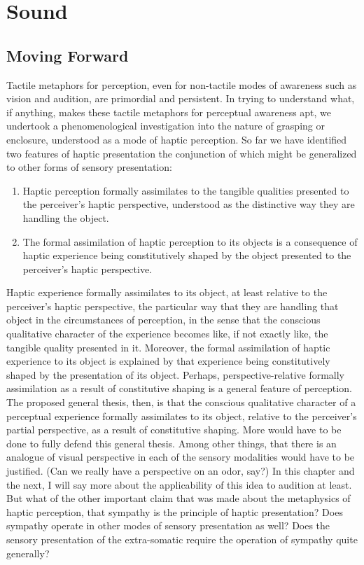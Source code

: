 \chapter{Sound} %
\label{cha:sound}

\section{Moving Forward} %
\label{sec:moving_forward}

Tactile metaphors for perception, even for non-tactile modes of awareness such as vision and audition, are primordial and persistent. In trying to understand what, if anything, makes these tactile metaphors for perceptual awareness apt, we undertook a phenomenological investigation into the nature of grasping or enclosure, understood as a mode of haptic perception. So far we have identified two features of haptic presentation the conjunction of which might be generalized to other forms of sensory presentation: 
\begin{enumerate}[(1)]
	\item Haptic perception formally assimilates to the tangible qualities presented to the perceiver's haptic perspective, understood as the distinctive way they are handling the object.
	\item The formal assimilation of haptic perception to its objects is a consequence of haptic experience being constitutively shaped by the object presented to the perceiver's haptic perspective.
\end{enumerate}
Haptic experience formally assimilates to its object, at least relative to the perceiver's haptic perspective, the particular way that they are handling that object in the circumstances of perception, in the sense that the conscious qualitative character of the experience becomes like, if not exactly like, the tangible quality presented in it. Moreover, the formal assimilation of haptic experience to its object is explained by that experience being constitutively shaped by the presentation of its object. Perhaps, perspective-relative formally assimilation as a result of constitutive shaping is a general feature of perception. The proposed general thesis, then, is that the conscious qualitative character of a perceptual experience formally assimilates to its object, relative to the perceiver's partial perspective, as a result of constitutive shaping. More would have to be done to fully defend this general thesis. Among other things, that there is an analogue of visual perspective in each of the sensory modalities would have to be justified. (Can we really have a perspective on an odor, say?) In this chapter and the next, I will say more about the applicability of this idea to audition at least. But what of the other important claim that was made about the metaphysics of haptic perception, that sympathy is the principle of haptic presentation? Does sympathy operate in other modes of sensory presentation as well? Does the sensory presentation of the extra-somatic require the operation of sympathy quite generally?

